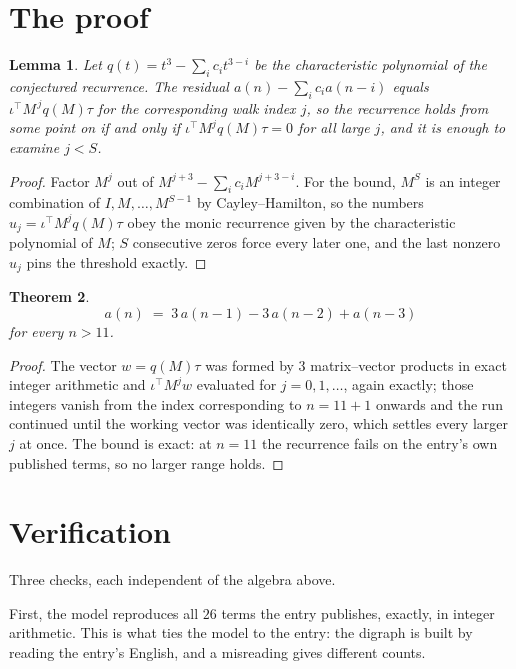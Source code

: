\documentclass[11pt,a4paper]{article}
\theoremstyle{plain}
\newtheorem{theorem}{Theorem}
\newtheorem{lemma}[theorem]{Lemma}
\theoremstyle{definition}
\begin{document}
\section{The proof}

\begin{lemma}\label{lem:crit}
Let $q(t)=t^{3}-\sum_i c_it^{3-i}$ be the characteristic polynomial of the
conjectured recurrence. The residual $a(n)-\sum_ic_ia(n-i)$ equals
$\iota^{\!\top}M^{\,j}q(M)\tau$ for the corresponding walk index $j$, so the recurrence
holds from some point on if and only if $\iota^{\!\top}M^{j}q(M)\tau=0$ for all large $j$,
and it is enough to examine $j<S$.
\end{lemma}

\begin{proof}
Factor $M^{j}$ out of $M^{j+3}-\sum_ic_iM^{j+3-i}$. For the bound, $M^{S}$
is an integer combination of $I,M,\dots,M^{S-1}$ by Cayley--Hamilton, so the numbers
$u_j=\iota^{\!\top}M^{j}q(M)\tau$ obey the monic recurrence given by the characteristic
polynomial of $M$; $S$ consecutive zeros force every later one, and the last nonzero $u_j$
pins the threshold exactly.
\end{proof}

\begin{theorem}
\[
a(n)\;=\;3\,a(n-1) - 3\,a(n-2) + a(n-3)
\]
for every $n>11$.
\end{theorem}

\begin{proof}
The vector $w=q(M)\tau$ was formed by $3$ matrix--vector products in exact integer
arithmetic and $\iota^{\!\top}M^{j}w$ evaluated for $j=0,1,\dots$, again exactly; those
integers vanish from the index corresponding to $n=11+1$ onwards and the run continued
until the working vector was identically zero, which settles every larger $j$ at once. The bound is exact: at $n=11$ the recurrence fails on the entry's own published terms, so no larger range holds.
\end{proof}

\section{Verification}

Three checks, each independent of the algebra above.

First, the model reproduces all $26$ terms the entry publishes, exactly, in integer
arithmetic. This is what ties the model to the entry: the digraph is built by reading the
entry's English, and a misreading gives different counts.
\end{document}
